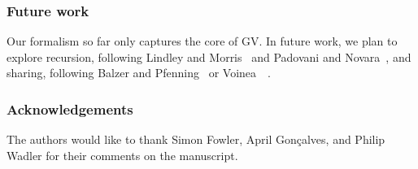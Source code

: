 \documentclass[main.tex]{subfiles}
\begin{document}
\subsubsection*{Future work}
Our formalism so far only captures the core of GV. In future work, we plan to explore recursion, following Lindley and Morris~\cite{lindleymorris16} and Padovani and Novara~\cite{padovaninovara15}, and sharing, following Balzer and Pfenning~\cite{balzerpfenning17} or Voinea~\etal~\cite{VoineaDG19}.

\subsubsection*{Acknowledgements}
The authors would like to thank Simon Fowler, April Gon\c{c}alves, and Philip Wadler for their comments on the manuscript.
\end{document}
